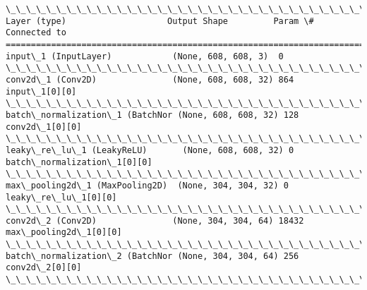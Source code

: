 \documentclass[11pt]{article}
\begin{document}
    \begin{Verbatim}[commandchars=\\\{\}]
\_\_\_\_\_\_\_\_\_\_\_\_\_\_\_\_\_\_\_\_\_\_\_\_\_\_\_\_\_\_\_\_\_\_\_\_\_\_\_\_\_\_\_\_\_\_\_\_\_\_\_\_\_\_\_\_\_\_\_\_\_\_\_\_\_\_\_\_\_\_\_\_\_\_\_\_\_\_\_\_\_\_\_\_\_\_\_\_\_\_\_\_\_\_\_\_\_\_
Layer (type)                    Output Shape         Param \#     Connected to                     
==================================================================================================
input\_1 (InputLayer)            (None, 608, 608, 3)  0                                            
\_\_\_\_\_\_\_\_\_\_\_\_\_\_\_\_\_\_\_\_\_\_\_\_\_\_\_\_\_\_\_\_\_\_\_\_\_\_\_\_\_\_\_\_\_\_\_\_\_\_\_\_\_\_\_\_\_\_\_\_\_\_\_\_\_\_\_\_\_\_\_\_\_\_\_\_\_\_\_\_\_\_\_\_\_\_\_\_\_\_\_\_\_\_\_\_\_\_
conv2d\_1 (Conv2D)               (None, 608, 608, 32) 864         input\_1[0][0]                    
\_\_\_\_\_\_\_\_\_\_\_\_\_\_\_\_\_\_\_\_\_\_\_\_\_\_\_\_\_\_\_\_\_\_\_\_\_\_\_\_\_\_\_\_\_\_\_\_\_\_\_\_\_\_\_\_\_\_\_\_\_\_\_\_\_\_\_\_\_\_\_\_\_\_\_\_\_\_\_\_\_\_\_\_\_\_\_\_\_\_\_\_\_\_\_\_\_\_
batch\_normalization\_1 (BatchNor (None, 608, 608, 32) 128         conv2d\_1[0][0]                   
\_\_\_\_\_\_\_\_\_\_\_\_\_\_\_\_\_\_\_\_\_\_\_\_\_\_\_\_\_\_\_\_\_\_\_\_\_\_\_\_\_\_\_\_\_\_\_\_\_\_\_\_\_\_\_\_\_\_\_\_\_\_\_\_\_\_\_\_\_\_\_\_\_\_\_\_\_\_\_\_\_\_\_\_\_\_\_\_\_\_\_\_\_\_\_\_\_\_
leaky\_re\_lu\_1 (LeakyReLU)       (None, 608, 608, 32) 0           batch\_normalization\_1[0][0]      
\_\_\_\_\_\_\_\_\_\_\_\_\_\_\_\_\_\_\_\_\_\_\_\_\_\_\_\_\_\_\_\_\_\_\_\_\_\_\_\_\_\_\_\_\_\_\_\_\_\_\_\_\_\_\_\_\_\_\_\_\_\_\_\_\_\_\_\_\_\_\_\_\_\_\_\_\_\_\_\_\_\_\_\_\_\_\_\_\_\_\_\_\_\_\_\_\_\_
max\_pooling2d\_1 (MaxPooling2D)  (None, 304, 304, 32) 0           leaky\_re\_lu\_1[0][0]              
\_\_\_\_\_\_\_\_\_\_\_\_\_\_\_\_\_\_\_\_\_\_\_\_\_\_\_\_\_\_\_\_\_\_\_\_\_\_\_\_\_\_\_\_\_\_\_\_\_\_\_\_\_\_\_\_\_\_\_\_\_\_\_\_\_\_\_\_\_\_\_\_\_\_\_\_\_\_\_\_\_\_\_\_\_\_\_\_\_\_\_\_\_\_\_\_\_\_
conv2d\_2 (Conv2D)               (None, 304, 304, 64) 18432       max\_pooling2d\_1[0][0]            
\_\_\_\_\_\_\_\_\_\_\_\_\_\_\_\_\_\_\_\_\_\_\_\_\_\_\_\_\_\_\_\_\_\_\_\_\_\_\_\_\_\_\_\_\_\_\_\_\_\_\_\_\_\_\_\_\_\_\_\_\_\_\_\_\_\_\_\_\_\_\_\_\_\_\_\_\_\_\_\_\_\_\_\_\_\_\_\_\_\_\_\_\_\_\_\_\_\_
batch\_normalization\_2 (BatchNor (None, 304, 304, 64) 256         conv2d\_2[0][0]                   
\_\_\_\_\_\_\_\_\_\_\_\_\_\_\_\_\_\_\_\_\_\_\_\_\_\_\_\_\_\_\_\_\_\_\_\_\_\_\_\_\_\_\_\_\_\_\_\_\_\_\_\_\_\_\_\_\_\_\_\_\_\_\_\_\_\_\_\_\_\_\_\_\_\_\_\_\_\_\_\_\_\_\_\_\_\_\_\_\_\_\_\_\_\_\_\_\_\_

\end{Verbatim}
\end{document}
